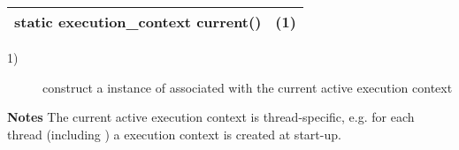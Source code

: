 \begin{tabular}{ l l }
    \midrule

    static execution\_context current() & (1)\\

    \midrule
\end{tabular}

\begin{description}
    \item[1)] construct a instance of \ectx associated with the current active
              execution context\\
\end{description}

{\bfseries Notes}
\newline
The current active execution context is thread-specific, e.g. for each thread
(including \main) a execution context is created at start-up.
